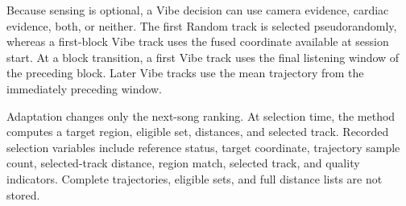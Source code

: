 Because sensing is optional, a Vibe decision can use camera evidence, cardiac
evidence, both, or neither. The first Random track is selected pseudorandomly,
whereas a first-block Vibe track uses the
fused coordinate available at session start. At a block transition, a first
Vibe track uses the final listening window of the preceding block. Later Vibe
tracks use the mean trajectory from the immediately preceding window.

Adaptation changes only the next-song ranking. At selection time, the method
computes a target region, eligible set, distances, and selected track. Recorded
selection variables include reference status, target coordinate, trajectory
sample count, selected-track distance, region match, selected track, and
quality indicators. Complete trajectories, eligible sets, and full distance
lists are not stored.
